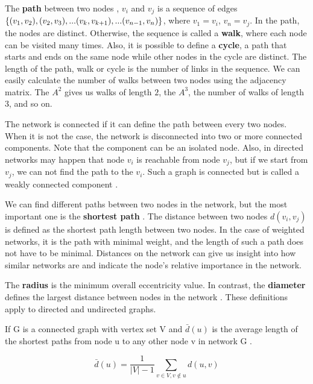 The \textbf{path} between two nodes \cite{van2010graph}, $v_i$ and $v_j$ is a sequence of edges $\{(v_1, v_2),  (v_2, v_3), ...(v_k, v_{k+1})\\,... (v_{n-1}, v_n)\}$, where $v_1=v_i$, $v_n=v_j$. In the path, the nodes are distinct. Otherwise, the sequence is called a \textbf{walk}, where each node can be visited many times. Also, it is possible to define a \textbf{cycle}, a path that starts and ends on the same node while other nodes in the cycle are distinct. The length of the path, walk or cycle is the number of links in the sequence. We can easily calculate the number of walks between two nodes using the adjacency matrix. The $A^2$ gives us walks of length $2$, the $A^3$, the number of walks of length 3, and so on. 

The network is connected if it can define the path between every two nodes. When it is not the case, the network is disconnected into two or more connected components. Note that the component can be an isolated node. Also, in directed networks may happen that node $v_i$ is reachable from node $v_j$, but if we start from $v_j$, we can not find the path to the $v_i$. Such a graph is connected but is called a weakly connected component \cite{jackson2010social}.

We can find different paths between two nodes in the network, but the most important one is the \textbf{shortest path} \cite{van2010graph, jackson2010social}. The distance between two nodes $d(v_i, v_j)$ is defined as the shortest path length between two nodes. 
In the case of weighted networks, it is the path with minimal weight, and the length of such a path does not have to be minimal. Distances on the network can give us insight into how similar networks are and indicate the node's relative importance in the network. 

The \textbf{radius} is the minimum overall eccentricity value. In contrast, the \textbf{diameter} defines the largest distance between nodes in the network \cite{van2010graph}. These definitions apply to directed and undirected graphs. 

If G is a connected graph with vertex set V and $\bar{d}(u)$ is the average length of the shortest paths from node u to any other node v in network G \cite{van2010graph}.

\begin{equation}
\bar{d}(u) = \frac{1}{|V|-1} \sum_{v\in V, v \notin u} d(u,v)  
\end{equation}

